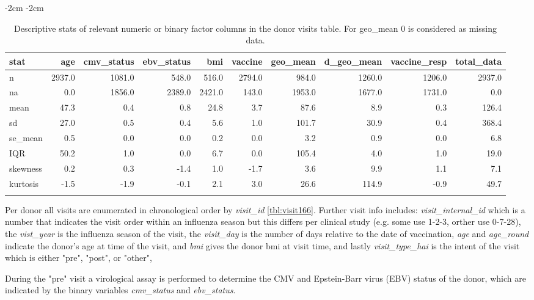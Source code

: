 \begin{table}[htpb]
\addtolength{\leftskip} {-2cm} %
\addtolength{\rightskip} {-2cm} %
\begin{tabular}{lrrrrrrrrr}
\toprule{}
stat & age & cmv\_status & ebv\_status & bmi & vaccine & geo\_mean & d\_geo\_mean & vaccine\_resp & total\_data\\
\midrule{}
n & 2937.0 & 1081.0 & 548.0 & 516.0 & 2794.0 & 984.0 & 1260.0 & 1206.0 & 2937.0\\
na & 0.0 & 1856.0 & 2389.0 & 2421.0 & 143.0 & 1953.0 & 1677.0 & 1731.0 & 0.0\\
mean & 47.3 & 0.4 & 0.8 & 24.8 & 3.7 & 87.6 & 8.9 & 0.3 & 126.4\\
sd & 27.0 & 0.5 & 0.4 & 5.6 & 1.0 & 101.7 & 30.9 & 0.4 & 368.4\\
se\_mean & 0.5 & 0.0 & 0.0 & 0.2 & 0.0 & 3.2 & 0.9 & 0.0 & 6.8\\
\addlinespace
IQR & 50.2 & 1.0 & 0.0 & 6.7 & 0.0 & 105.4 & 4.0 & 1.0 & 19.0\\
skewness & 0.2 & 0.3 & -1.4 & 1.0 & -1.7 & 3.6 & 9.9 & 1.1 & 7.1\\
kurtosis & -1.5 & -1.9 & -0.1 & 2.1 & 3.0 & 26.6 & 114.9 & -0.9 & 49.7\\
\bottomrule{}
\end{tabular}
\caption{Descriptive stats of relevant numeric or binary factor columns in the
    donor visits table. For geo\_mean 0 is considered as missing data.}\label{tbl:visitsDesc}
\end{table}

Per donor all visits are enumerated in chronological order by
\textit{visit\_id} \autoref{tbl:visit166}. Further visit info includes:
\textit{visit\_internal\_id} which is a number that indicates the visit order
within an influenza season but this differs per clinical study (e.g. some use
1-2-3, orther use 0-7-28), the \textit{vist\_year} is the influenza season of
the visit, the \textit{visit\_day} is the number of days relative to the date
of vaccination,  \textit{age} and \textit{age\_round} indicate the donor's age
at time of the visit, and \textit{bmi} gives the donor bmi at visit time, and
lastly \textit{visit\_type\_hai} is the intent of the visit which is either
"pre", "post", or "other",

During the "pre" visit a virological assay is performed to determine the CMV
and Epstein-Barr virus (EBV) status of the donor, which are indicated by the
binary variables \textit{cmv\_status} and \textit{ebv\_status}.

